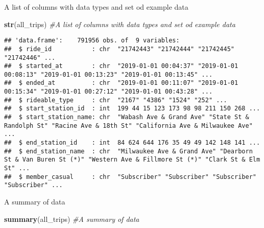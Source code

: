 \documentclass[
]{article}
\newenvironment{Shaded}{\begin{snugshade}}{\end{snugshade}}
\newcommand{\CommentTok}[1]{\textcolor[rgb]{0.56,0.35,0.01}{\textit{#1}}}
\newcommand{\FunctionTok}[1]{\textcolor[rgb]{0.13,0.29,0.53}{\textbf{#1}}}
\newcommand{\NormalTok}[1]{#1}
\begin{document}
A list of columns with data types and set od example data

\begin{Shaded}
\begin{Highlighting}[]
\FunctionTok{str}\NormalTok{(all\_trips) }\CommentTok{\#A list of columns with data types and set od example data}
\end{Highlighting}
\end{Shaded}

\begin{verbatim}
## 'data.frame':    791956 obs. of  9 variables:
##  $ ride_id           : chr  "21742443" "21742444" "21742445" "21742446" ...
##  $ started_at        : chr  "2019-01-01 00:04:37" "2019-01-01 00:08:13" "2019-01-01 00:13:23" "2019-01-01 00:13:45" ...
##  $ ended_at          : chr  "2019-01-01 00:11:07" "2019-01-01 00:15:34" "2019-01-01 00:27:12" "2019-01-01 00:43:28" ...
##  $ rideable_type     : chr  "2167" "4386" "1524" "252" ...
##  $ start_station_id  : int  199 44 15 123 173 98 98 211 150 268 ...
##  $ start_station_name: chr  "Wabash Ave & Grand Ave" "State St & Randolph St" "Racine Ave & 18th St" "California Ave & Milwaukee Ave" ...
##  $ end_station_id    : int  84 624 644 176 35 49 49 142 148 141 ...
##  $ end_station_name  : chr  "Milwaukee Ave & Grand Ave" "Dearborn St & Van Buren St (*)" "Western Ave & Fillmore St (*)" "Clark St & Elm St" ...
##  $ member_casual     : chr  "Subscriber" "Subscriber" "Subscriber" "Subscriber" ...
\end{verbatim}

A summary of data

\begin{Shaded}
\begin{Highlighting}[]
\FunctionTok{summary}\NormalTok{(all\_trips) }\CommentTok{\#A summary of data}
\end{Highlighting}
\end{Shaded}
\end{document}
